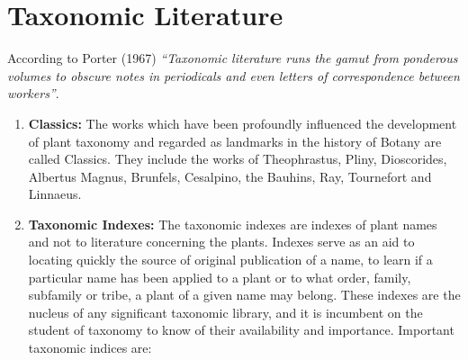 \documentclass[
]{book}
\begin{document}
\hypertarget{taxonomic-literature}{%
\section{Taxonomic Literature}\label{taxonomic-literature}}

According to Porter (1967) \emph{``Taxonomic literature runs the gamut from ponderous volumes to obscure notes in periodicals and even letters of correspondence between workers''}.

\begin{enumerate}
\def\labelenumi{\arabic{enumi}.}
\item
  \textbf{Classics:} The works which have been profoundly influenced the development of plant taxonomy and regarded as landmarks in the history of Botany are called Classics. They include the works of Theophrastus, Pliny, Dioscorides, Albertus Magnus, Brunfels, Cesalpino, the Bauhins, Ray, Tournefort and Linnaeus.
\item
  \textbf{Taxonomic Indexes:} The taxonomic indexes are indexes of plant names and not to literature concerning the plants. Indexes serve as an aid to locating quickly the source of original publication of a name, to learn if a particular name has been applied to a plant or to what order, family, subfamily or tribe, a plant of a given name may belong. These indexes are the nucleus of any significant taxonomic library, and it is incumbent on the student of taxonomy to know of their availability and importance. Important taxonomic indices are:


\end{enumerate}
\end{document}
